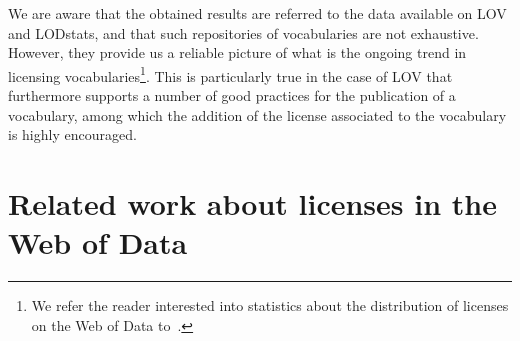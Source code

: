 We are aware that the obtained results are referred to the data available on LOV and LODstats, and that such repositories of vocabularies are not exhaustive. However, they provide us a reliable picture of what is the ongoing trend in licensing vocabularies\footnote{We refer the reader interested into statistics about the distribution of licenses on the Web of Data to~\cite{DBLP:conf/semweb/Rodriguez-DoncelGM13,DBLP:conf/semweb/GovernatoriRVG13}.}. This is particularly true in the case of LOV that furthermore supports a number of good practices for the publication of a vocabulary, among which the addition of the license associated to the vocabulary is highly encouraged.

\section{Related work about licenses in the Web of Data}
\label{sec:soalicense}


